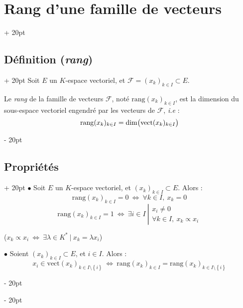 \documentclass[a4paper, 12pt, twoside]{article}
\newcommand{\lr}[1]{\left( #1 \right)}
\newcommand{\set}[1]{\left\{ #1 \right\}}
\newcommand{\ssi}{\ \Leftrightarrow \ }
\newcommand{\ind}[1][20pt]{\advance\leftskip + #1}
\newcommand{\deind}[1][20pt]{\advance\leftskip - #1}
\newenvironment{indt}[2][20pt]{#2 \par \ind[#1]}{\par \deind} %
\begin{document}
    \begin{indt}{\section{Rang d'une famille de vecteurs}}
        
        \begin{indt}{\subsection{Définition (\textit{rang})}}
            Soit $E$ un $K$-espace vectoriel, et $\mathcal F = (x_k)_{k \in I} \subset E$.
            
            Le \textit{rang} de la famille de vecteurs $\mathcal F$, noté $\mathrm{rang}(x_k)_{k \in I}$, est la dimension du sous-espace vectoriel engendré par les vecteurs de $\mathcal F$, \textit{i.e} :
                \[ \mathrm{rang}(x_k)_{k \in I} = \dim\!\lr{\mathrm{vect}(x_k)_{k \in I} \vphantom{\tfrac a a}} \]
        \end{indt}
        
        \vspace{12pt}
        
        \begin{indt}{\subsection{Propriétés}}
            $\bullet$ Soit $E$ un $K$-espace vectoriel, et $(x_k)_{k \in I} \subset E$. Alors :
                \[ \mathrm{rang}(x_k)_{k \in I} = 0 \ssi \forall k \in I,\ x_k = 0 \]
                \[
                    \mathrm{rang}(x_k)_{k \in I} = 1
                    \ssi
                    \exists i \in I\
                    \left|
                    \begin{array}{l}
                        x_i \neq 0
                        \\
                        \forall k \in I,\ x_k \propto x_i
                    \end{array}
                    \right.
                \]
            
            ($x_k \propto x_i \ssi \exists \lambda \in K^*\ |\ x_k = \lambda x_i$)
            
            \vspace{18pt}
            
            $\bullet$ Soient $(x_k)_{k \in I} \subset E$, et $i \in I$. Alors :
                \[ x_i \in \mathrm{vect}(x_k)_{k \in I \setminus \set i} \ssi \mathrm{rang}(x_k)_{k \in I} = \mathrm{rang}(x_k)_{k \in I \setminus \set i} \]
            

\end{indt}
\end{indt}
\end{document}
